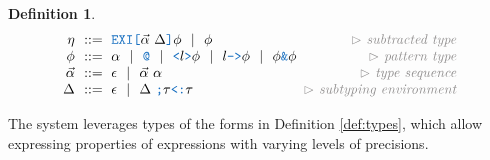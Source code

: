 \documentclass[acmsmall]{acmart}
\theoremstyle{definition}
\newtheorem{definition}{Definition}[section]
\begin{document}
\begin{definition}
\[\begin{array}[t]{r@{}l@{}r}
    \nonterm{\eta} & \is 
    \begin{array}[t]{@{}l}
      \obj{EXI[}\vec{\alpha}\ \Delta \obj{]} \phi \sep 
      \phi
    \end{array}
    & \com{subtracted type}
    \\
    \nonterm{\phi} & \is 
    \begin{array}[t]{@{}l}
      \alpha \sep
      \obj{@} \sep
      \obj{<}l\obj{>}\phi \sep 
      l\obj{->}\phi \sep 
      \phi\obj{\&}\phi
    \end{array}
    & \com{pattern type}
    \\
    \nonterm{\vec{\alpha}} & \is \epsilon \sep \vec{\alpha}\ \alpha 
    & \com{type sequence}
    \\
    \nonterm{\Delta} & \is \epsilon \sep \Delta\ \obj{;} \tau \obj{<:} \tau
    & \com{subtyping environment}
  \end{array}\]
\end{definition}
\hfill

The system leverages types of the forms in Definition \ref{def:types}, 
which allow expressing properties of expressions with varying levels of precisions. 
\end{document}
